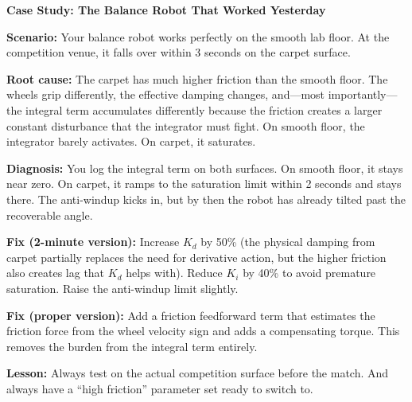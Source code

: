 \begin{mdframed}[linewidth=1pt, innertopmargin=10pt, innerbottommargin=10pt]
\textbf{Case Study: The Balance Robot That Worked Yesterday}

\vspace{0.3em}
\textbf{Scenario:} Your balance robot works perfectly on the smooth lab floor. At the competition venue, it falls over within 3 seconds on the carpet surface.

\textbf{Root cause:} The carpet has much higher friction than the smooth floor. The wheels grip differently, the effective damping changes, and---most importantly---the integral term accumulates differently because the friction creates a larger constant disturbance that the integrator must fight. On smooth floor, the integrator barely activates. On carpet, it saturates.

\textbf{Diagnosis:} You log the integral term on both surfaces. On smooth floor, it stays near zero. On carpet, it ramps to the saturation limit within 2 seconds and stays there. The anti-windup kicks in, but by then the robot has already tilted past the recoverable angle.

\textbf{Fix (2-minute version):} Increase $K_d$ by 50\% (the physical damping from carpet partially replaces the need for derivative action, but the higher friction also creates lag that $K_d$ helps with). Reduce $K_i$ by 40\% to avoid premature saturation. Raise the anti-windup limit slightly.

\textbf{Fix (proper version):} Add a friction feedforward term that estimates the friction force from the wheel velocity sign and adds a compensating torque. This removes the burden from the integral term entirely.

\textbf{Lesson:} Always test on the actual competition surface before the match. And always have a ``high friction'' parameter set ready to switch to.
\end{mdframed}

\vspace{1em}

